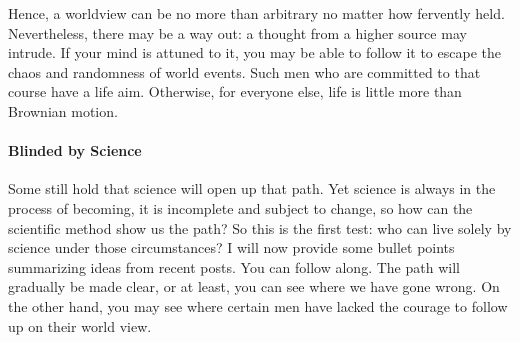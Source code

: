 Hence, a worldview can be no more than arbitrary no matter how fervently held. Nevertheless, there may be a way out: a thought from a higher source may intrude. If your mind is attuned to it, you may be able to follow it to escape the chaos and randomness of world events. Such men who are committed to that course have a life aim. Otherwise, for everyone else, life is little more than Brownian motion.

\paragraph{Blinded by Science}
Some still hold that science will open up that path. Yet science is always in the process of becoming, it is incomplete and subject to change, so how can the scientific method show us the path? So this is the first test: who can live solely by science under those circumstances? I will now provide some bullet points summarizing ideas from recent posts. You can follow along. The path will gradually be made clear, or at least, you can see where we have gone wrong. On the other hand, you may see where certain men have lacked the courage to follow up on their world view.

